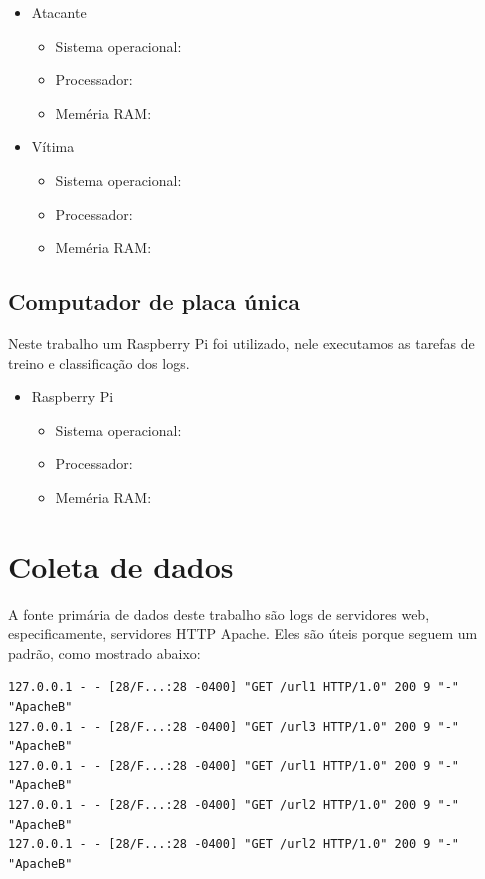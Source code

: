 \begin{itemize}
    \item Atacante
        \begin{itemize}
            \item Sistema operacional:
            \item Processador: 
            \item Meméria RAM: 
        \end{itemize}
    \item Vítima
        \begin{itemize}
            \item Sistema operacional: 
            \item Processador: 
            \item Meméria RAM: 
        \end{itemize}        
\end{itemize}



\subsection{Computador de placa única}

Neste trabalho um Raspberry Pi foi utilizado, nele executamos as tarefas de treino e classificação
dos logs.

\begin{itemize}
    \item Raspberry Pi
        \begin{itemize}
            \item Sistema operacional: 
            \item Processador: 
            \item Meméria RAM: 
        \end{itemize}
\end{itemize}

\section{Coleta de dados}

A fonte primária de dados deste trabalho são logs de servidores web, especificamente,
servidores HTTP Apache. Eles são úteis porque seguem um padrão, como mostrado abaixo:

\begin{verbatim}
127.0.0.1 - - [28/F...:28 -0400] "GET /url1 HTTP/1.0" 200 9 "-" "ApacheB"
127.0.0.1 - - [28/F...:28 -0400] "GET /url3 HTTP/1.0" 200 9 "-" "ApacheB"
127.0.0.1 - - [28/F...:28 -0400] "GET /url1 HTTP/1.0" 200 9 "-" "ApacheB"
127.0.0.1 - - [28/F...:28 -0400] "GET /url2 HTTP/1.0" 200 9 "-" "ApacheB"
127.0.0.1 - - [28/F...:28 -0400] "GET /url2 HTTP/1.0" 200 9 "-" "ApacheB"
\end{verbatim}


